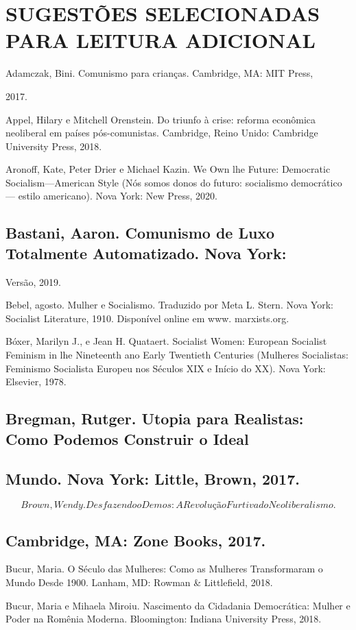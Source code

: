 \chapter{SUGESTÕES SELECIONADAS PARA LEITURA ADICIONAL}\label{SUGESTÕES SELECIONADAS PARA LEITURA ADICIONAL}
 \par 
Adamczak, Bini. Comunismo para crianças. Cambridge, MA: MIT Press,
 \par 
2017.
 \par 
Appel, Hilary e Mitchell Orenstein. Do triunfo à crise: reforma econômica neoliberal em países pós-comunistas. Cambridge, Reino Unido: Cambridge University Press, 2018.
 \par 
Aronoff, Kate, Peter Drier e Michael Kazin. We Own lhe Future: Democratic Socialism—American Style (Nós somos donos do futuro: socialismo democrático — estilo americano). Nova York: New Press, 2020.
 \par 
\section{Bastani, Aaron. Comunismo de Luxo Totalmente Automatizado. Nova York:}
 \par 
Versão, 2019.
 \par 
Bebel, agosto. Mulher e Socialismo. Traduzido por Meta L. Stern. Nova York: Socialist Literature, 1910. Disponível online em www. marxists.org.
 \par 
Bóxer, Marilyn J., e Jean H. Quataert. Socialist Women: European Socialist Feminism in lhe Nineteenth ano Early Twentieth Centuries (Mulheres Socialistas: Feminismo Socialista Europeu nos Séculos XIX e Início do XX). Nova York: Elsevier, 1978.
 \par 
\section{Bregman, Rutger. Utopia para Realistas: Como Podemos Construir o Ideal}
 \par 
\section{Mundo. Nova York: Little, Brown, 2017.}
 \par 
\[Brown, Wendy. Desfazendo o Demos: A Revolução Furtiva do Neoliberalismo.\]
 \par 
\section{Cambridge, MA: Zone Books, 2017.}
 \par 
Bucur, Maria. O Século das Mulheres: Como as Mulheres Transformaram o Mundo Desde 1900. Lanham, MD: Rowman & Littlefield, 2018.
 \par 
Bucur, Maria e Mihaela Miroiu. Nascimento da Cidadania Democrática: Mulher e Poder na Romênia Moderna. Bloomington: Indiana University Press, 2018.
 \par 
